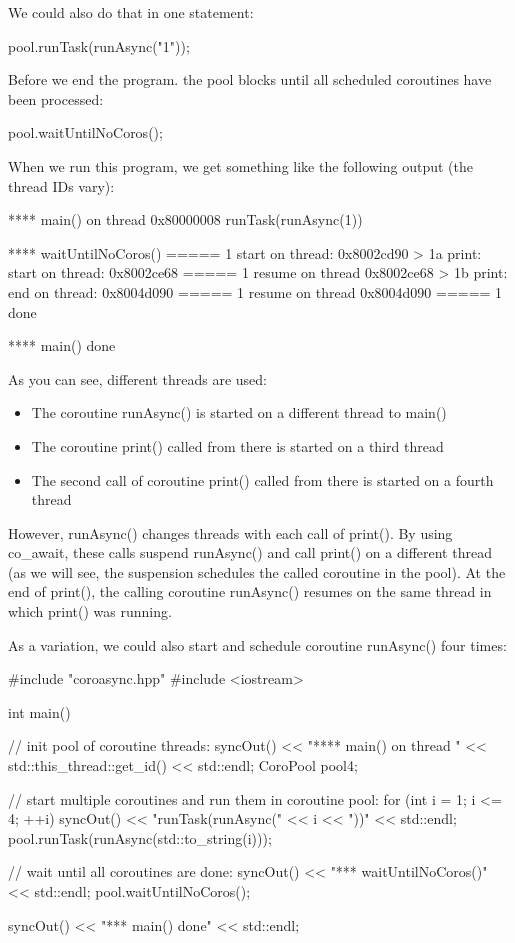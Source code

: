 We could also do that in one statement:

\begin{cpp}
pool.runTask(runAsync("1"));
\end{cpp}

Before we end the program. the pool blocks until all scheduled coroutines have been processed:

\begin{cpp}
pool.waitUntilNoCoros();
\end{cpp}

When we run this program, we get something like the following output (the thread IDs vary):

\begin{shell}
**** main() on thread 0x80000008
runTask(runAsync(1))

**** waitUntilNoCoros()
===== 1 start on thread: 0x8002cd90
    > 1a print: start on thread: 0x8002ce68
===== 1 resume on thread 0x8002ce68
    > 1b print: end on thread: 0x8004d090
===== 1 resume on thread 0x8004d090
===== 1 done

**** main() done
\end{shell}

As you can see, different threads are used:

\begin{itemize}
\item 
The coroutine runAsync() is started on a different thread to main()

\item 
The coroutine print() called from there is started on a third thread

\item 
The second call of coroutine print() called from there is started on a fourth thread
\end{itemize}

However, runAsync() changes threads with each call of print(). By using co\_await, these calls suspend runAsync() and call print() on a different thread (as we will see, the suspension schedules the called coroutine in the pool). At the end of print(), the calling coroutine runAsync() resumes on the same thread in which print() was running.

As a variation, we could also start and schedule coroutine runAsync() four times:


\begin{cpp}
#include "coroasync.hpp"
#include <iostream>

int main()
{
	// init pool of coroutine threads:
	syncOut() << "**** main() on thread " << std::this_thread::get_id()
			  << std::endl;
	CoroPool pool{4};
	
	// start multiple coroutines and run them in coroutine pool:
	for (int i = 1; i <= 4; ++i) {
		syncOut() << "runTask(runAsync(" << i << "))" << std::endl;
		pool.runTask(runAsync(std::to_string(i)));
	}
	
	// wait until all coroutines are done:
	syncOut() << "\n**** waitUntilNoCoros()" << std::endl;
	pool.waitUntilNoCoros();
	
	syncOut() << "\n**** main() done" << std::endl;
}
\end{cpp}

